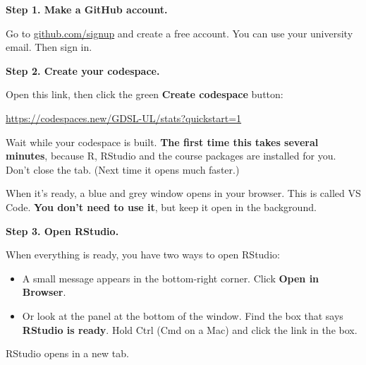 \documentclass[
  letterpaper,
  DIV=11,
  numbers=noendperiod]{scrreprt}
\providecommand{\tightlist}{%
  \setlength{\itemsep}{0pt}\setlength{\parskip}{0pt}}
\begin{document}

\textbf{Step 1. Make a GitHub account.}

Go to \href{https://github.com/signup}{github.com/signup} and create a
free account. You can use your university email. Then sign in.

\textbf{Step 2. Create your codespace.}

Open this link, then click the green \textbf{Create codespace} button:

\url{https://codespaces.new/GDSL-UL/stats?quickstart=1}

Wait while your codespace is built. \textbf{The first time this takes
several minutes}, because R, RStudio and the course packages are
installed for you. Don't close the tab. (Next time it opens much
faster.)

When it's ready, a blue and grey window opens in your browser. This is
called VS Code. \textbf{You don't need to use it}, but keep it open in
the background.

\textbf{Step 3. Open RStudio.}

When everything is ready, you have two ways to open RStudio:

\begin{itemize}
\tightlist
\item
  A small message appears in the bottom-right corner. Click \textbf{Open
  in Browser}.
\item
  Or look at the panel at the bottom of the window. Find the box that
  says \textbf{RStudio is ready}. Hold Ctrl (Cmd on a Mac) and click the
  link in the box.
\end{itemize}

RStudio opens in a new tab.
\end{document}
